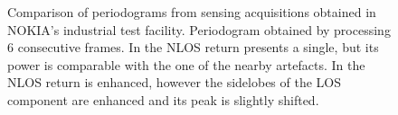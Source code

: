 	\begin{figure}[H]
	\centering
	
	\hfill
	\caption[]{\small Comparison of periodograms from sensing acquisitions obtained in NOKIA's industrial test facility.
		Periodogram obtained by processing 6 consecutive frames.
		In  the NLOS return presents a single, but its power is comparable with the one of the nearby artefacts. In  the NLOS return is enhanced, however the sidelobes of the LOS component are enhanced and its peak is slightly shifted.}
	\label{fig:Test1_huma_crap-ecac}
\end{figure}




